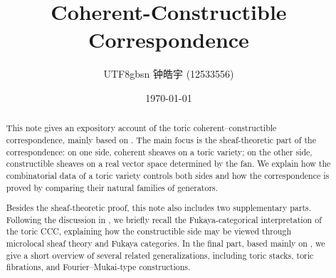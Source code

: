 \documentclass[a4paper,10pt]{article}
\title{Coherent-Constructible Correspondence}
\author{
    \begin{CJK*}{UTF8}{gbsn}
    钟皓宇 (12533556)
    \end{CJK*}
}
\date{\today}
\begin{document}
\maketitle
\begin{abstract}
This note gives an expository account of the toric coherent--constructible
correspondence, mainly based on \cite{FLTZ09}. The main focus is the sheaf-theoretic part of the correspondence: on one side, coherent sheaves on a toric variety; on the other side, constructible sheaves on a real vector space determined by the fan. We explain how the combinatorial data of a toric variety controls both sides and how the correspondence is proved by comparing their natural families of generators.

Besides the sheaf-theoretic proof, this note also includes two supplementary parts. Following the discussion in \cite{FLTZ09}, we briefly recall the Fukaya-categorical interpretation of the toric CCC, explaining how the constructible side may be viewed through microlocal sheaf theory and Fukaya categories. In the final part, based mainly on \cite{FLTZDM,Kuw20,FLTZFM,HuSuh23}, we give a short overview of several related generalizations, including toric stacks, toric fibrations, and Fourier--Mukai-type constructions.
\end{abstract}

\tableofcontents












\end{document}
